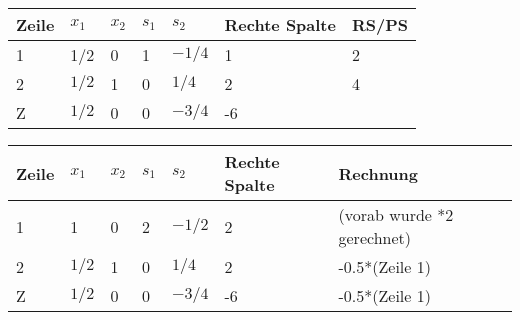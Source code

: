\begin{table}[!ht]
\begin{tabular}{|l|l|l|l|l|l|l|}
\hline
\rowcolor[HTML]{C0C0C0} 
Zeile                     & $x_1$                          & $x_2$                        & $s_1$                        & $s_2$                          & Rechte Spalte             & RS/PS \\ \hline
\rowcolor[HTML]{9698ED} 
\cellcolor[HTML]{C0C0C0}1 & \cellcolor[HTML]{CE6301}1/2 & 0                         & 1                         & $-1/4$                        & 1                         & 2     \\ \hline
\cellcolor[HTML]{C0C0C0}2 & \cellcolor[HTML]{68CBD0}$1/2$ & \cellcolor[HTML]{FFFFFF}1 & \cellcolor[HTML]{FFFFFF}0 & \cellcolor[HTML]{FFFFFF}$1/4$ & \cellcolor[HTML]{FFFFFF}2 & 4     \\ \hline
\cellcolor[HTML]{C0C0C0}Z & \cellcolor[HTML]{68CBD0}$1/2$ & \cellcolor[HTML]{FFFFFF}0 & 0                         & $-3/4$                       & -6                        &       \\ \hline
\end{tabular}
\end{table}

\begin{table}[!ht]
\begin{tabular}{|l|l|l|l|l|l|l|}
\hline
\rowcolor[HTML]{C0C0C0} 
Zeile                     & $x_1$  & $x_2$ & $s_1$ & $s_2$  & Rechte Spalte & Rechnung                   \\ \hline
\rowcolor[HTML]{FFFFFF} 
\cellcolor[HTML]{C0C0C0}1 & 1   & 0  & 2  & $-1/2$ & 2             & (vorab wurde *2 gerechnet) \\ \hline
\rowcolor[HTML]{FFFFFF} 
\cellcolor[HTML]{C0C0C0}2 & $1/2$ & 1  & 0  & $1/4$  & 2             & -0.5*(Zeile 1)             \\ \hline
\rowcolor[HTML]{FFFFFF} 
\cellcolor[HTML]{C0C0C0}Z & $1/2$ & 0  & 0  & $-3/4$ & -6            & -0.5*(Zeile 1)             \\ \hline
\end{tabular}
\end{table}

